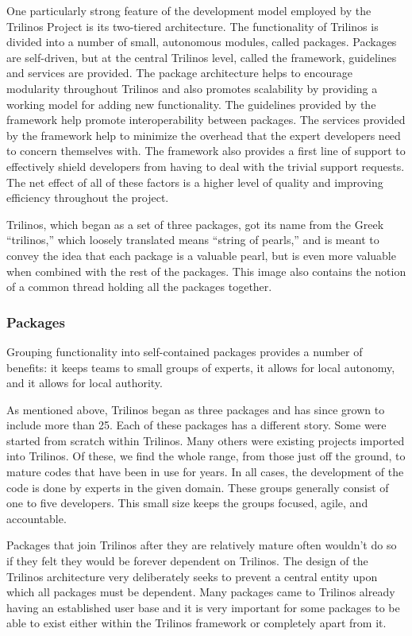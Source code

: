 \documentclass[12pt,relax]{article}
\begin{document}
One particularly strong feature of the development model employed by the
Trilinos Project is its two-tiered architecture.  The functionality of Trilinos
is divided into a number of small, autonomous modules, called packages. 
Packages are self-driven, but at the central Trilinos level, called the
framework, guidelines and services are provided.  The package architecture
helps to encourage modularity throughout Trilinos and also promotes scalability
by providing a working model for adding new functionality.  The guidelines
provided by the framework help promote interoperability between packages.
The services provided by the framework help to minimize the overhead that the
expert developers need to concern themselves with.  The framework also provides
a first line of support to effectively shield developers from having to deal
with the trivial support requests.  The net effect of all of these factors is
a higher level of quality and improving efficiency throughout the project.

Trilinos, which began as a set of three packages, got its name from the Greek
``trilinos,'' which loosely translated means ``string of pearls,'' and is
meant to convey the idea that each package is a valuable pearl, but is even
more valuable when combined with the rest of the packages.  This image also
contains the notion of a common thread holding all the packages together.

  \subsubsection{Packages}
  
  Grouping functionality into self-contained packages provides a number of
  benefits:  it keeps teams to small groups of experts, it allows for local
  autonomy, and it allows for local authority.
  
  As mentioned above, Trilinos began as three packages and has since grown to 
  include more than 25.  Each of these packages has a different story.  Some
  were started from scratch within Trilinos.  Many others were existing
  projects imported into Trilinos.  Of these, we find the whole range, from
  those just off the ground, to mature codes that have been in use for years.
  In all cases, the development of the code is done by experts in the given
  domain.  These groups generally consist of one to five developers.  This
  small size keeps the groups focused, agile, and accountable.
    
  Packages that join Trilinos after they are relatively mature often wouldn't
  do so if they felt they would be forever dependent on Trilinos.  The design
  of the Trilinos architecture very deliberately seeks to prevent a central
  entity upon which all packages must be dependent.  Many packages came to 
  Trilinos already having an established user base and it is very important
  for some packages to be able to exist either within the Trilinos framework
  or completely apart from it.
  
\end{document}
